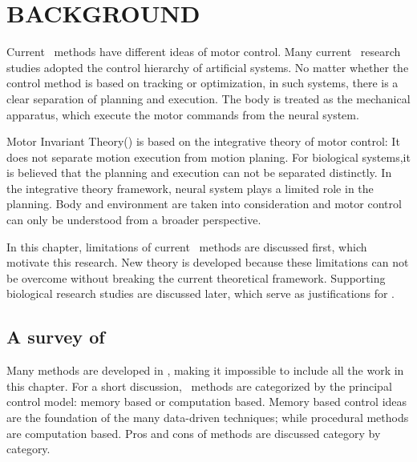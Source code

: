 \chapter{BACKGROUND}
\label{chap:background}

Current \cms\ methods have different ideas of motor control.
Many current \cms\ research studies adopted the control hierarchy of artificial systems.
No matter whether the control method is based on tracking or optimization, in such systems, there is a clear separation of planning and execution.
The body is treated as the mechanical apparatus, which execute the motor commands from the neural system.



Motor Invariant Theory(\moit) is based on the integrative theory of motor control\citep{dickinson2000animals}:
It does not separate motion execution from motion planing.
For biological systems,it is believed that the planning and execution can not be separated distinctly.
In the integrative theory framework, neural system plays a limited role in the planning.
Body and environment are taken into consideration and motor control can only be understood from a broader perspective.

In this chapter, limitations of current \cms\ methods are discussed first, which motivate this research.
New theory is developed because these limitations can not be overcome without breaking the current theoretical framework.
Supporting biological research studies are discussed later,  which serve as justifications for \moit.



\section{A survey of \cms}

Many methods are developed in {\cms}, making it impossible to include all the work in this chapter.
For a short discussion, \cms\ methods are categorized by the principal control model: memory based or computation based.
Memory based control ideas are the foundation of the  many data-driven techniques;
while procedural methods are computation based.
Pros and cons of methods are discussed category by category.

